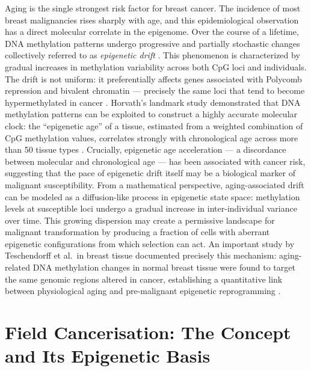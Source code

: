 Aging is the single strongest risk factor for breast cancer. The incidence of most
breast malignancies rises sharply with age, and this epidemiological observation
has a direct molecular correlate in the epigenome.
Over the course of a lifetime, DNA methylation patterns undergo progressive and
partially stochastic changes collectively referred to as \textit{epigenetic drift}
\cite{Horvath2013}. This phenomenon is characterized by gradual increases in
methylation variability across both CpG loci and individuals. The drift is not
uniform: it preferentially affects genes associated with Polycomb repression and
bivalent chromatin — precisely the same loci that tend to become hypermethylated
in cancer \cite{Teschendorff2010}.
Horvath's landmark study demonstrated that DNA methylation patterns can be
exploited to construct a highly accurate molecular clock: the ``epigenetic age''
of a tissue, estimated from a weighted combination of CpG methylation values,
correlates strongly with chronological age across more than 50 tissue types
\cite{Horvath2013}. Crucially, epigenetic age acceleration — a discordance between
molecular and chronological age — has been associated with cancer risk, suggesting
that the pace of epigenetic drift itself may be a biological marker of malignant
susceptibility.
From a mathematical perspective, aging-associated drift can be modeled as a
diffusion-like process in epigenetic state space: methylation levels at susceptible
loci undergo a gradual increase in inter-individual variance over time. This growing
dispersion may create a permissive landscape for malignant transformation by
producing a fraction of cells with aberrant epigenetic configurations from which
selection can act.
An important study by Teschendorff et al.\ in breast tissue documented precisely
this mechanism: aging-related DNA methylation changes in normal breast tissue
were found to target the same genomic regions altered in cancer, establishing a
quantitative link between physiological aging and pre-malignant epigenetic
reprogramming \cite{Teschendorff2019}.


\section{Field Cancerisation: The Concept and Its Epigenetic Basis}

